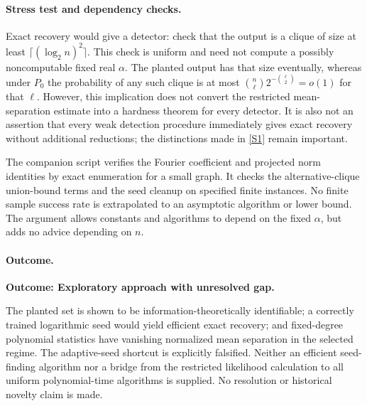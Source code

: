 \documentclass[11pt,a4paper]{article}
\newcommand{\sref}[2]{\hyperlink{source:#1:#2}{[S#2]}}
\numberwithin{equation}{section}
\begin{document}
\paragraph{Stress test and dependency checks.}
Exact recovery would give a detector: check that the output is a
clique of size at least $\lceil(\log_2 n)^2\rceil$.  This check is
uniform and need not compute a possibly noncomputable fixed real
$\alpha$.  The planted output has that size eventually, whereas under
$P_0$ the probability of any such clique is at most
$\binom n\ell2^{-\binom\ell2}=o(1)$ for that $\ell$.
However, this implication does not convert the restricted
mean-separation estimate into a hardness theorem for every detector.
It is also not an assertion that every weak detection procedure
immediately gives exact recovery without additional reductions;
the distinctions made in \sref{30006743}{1} remain important.

The companion script verifies the Fourier coefficient and projected
norm identities by exact enumeration for a small graph.  It checks
the alternative-clique union-bound terms and the seed cleanup on
specified finite instances.  No finite sample success rate is
extrapolated to an asymptotic algorithm or lower bound.  The argument
allows constants and algorithms to depend on the fixed $\alpha$, but
adds no advice depending on $n$.

\paragraph{Outcome.}
\textbf{Outcome: Exploratory approach with unresolved gap.}

The planted set is shown to be information-theoretically identifiable;
a correctly trained logarithmic seed would yield efficient exact
recovery; and fixed-degree polynomial statistics have vanishing
normalized mean separation in the selected regime.  The adaptive-seed
shortcut is explicitly falsified.  Neither an efficient seed-finding
algorithm nor a bridge from the restricted likelihood calculation to
all uniform polynomial-time algorithms is supplied.  No resolution
or historical novelty claim is made.
\end{document}
